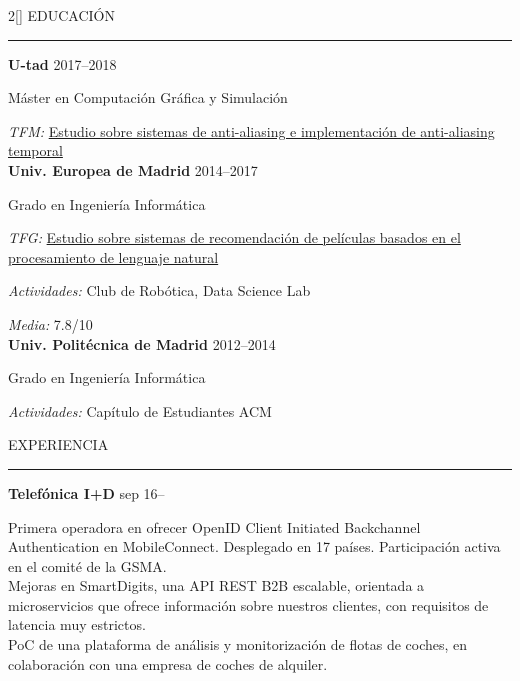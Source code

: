 \documentclass[a4paper, 12pt]{article}
\newenvironment{myparacol}[2][]{%
\begin{paracol}{#2}[#1]\setlength{\parindent}{0pt}}{%
\end{paracol}}
\begin{document}
\setlength{\columnsep}{24pt}
\begin{sloppypar}
\begin{myparacol}{2}
    EDUCACIÓN
    \vspace{1mm}
    \hrule
    \kern9pt
    \textbf{U-tad} \hfill 2017--2018

    Máster en Computación Gráfica y Simulación

    \textit{TFM:} \href{https://github.com/hugo19941994/temporal-aa-doc/raw/master/thesis.pdf}{Estudio sobre sistemas de anti-aliasing e implementación de anti-aliasing temporal}\\

    \textbf{Univ. Europea de Madrid} \hfill 2014--2017

    Grado en Ingeniería Informática

    \textit{TFG:} \href{https://github.com/hugo19941994/movie-pepper-doc/raw/master/thesis.pdf}{Estudio sobre sistemas de recomendación de películas basados en el procesamiento de lenguaje natural}

    \textit{Actividades:} Club de Robótica, Data Science Lab

    \textit{Media:} 7.8/10\\

    \textbf{Univ. Politécnica de Madrid} \hfill 2012--2014

    Grado en Ingeniería Informática

    \textit{Actividades:} Capítulo de Estudiantes ACM
    \\

    \switchcolumn{}

    EXPERIENCIA
    \vspace{1mm}
    \hrule
    \kern9pt

    \textbf{Telefónica I+D} \hfill sep 16--

    Primera operadora en ofrecer OpenID Client Initiated Backchannel Authentication en MobileConnect. Desplegado en 17 países. Participación activa en el comité de la GSMA\@.\\

    Mejoras en SmartDigits, una API REST B2B escalable, orientada a microservicios que ofrece información sobre nuestros clientes, con requisitos de latencia muy estrictos.\\

    PoC de una plataforma de análisis y monitorización de flotas de coches, en colaboración con una empresa de coches de alquiler.\\


\end{myparacol}
\end{sloppypar}
\end{document}
